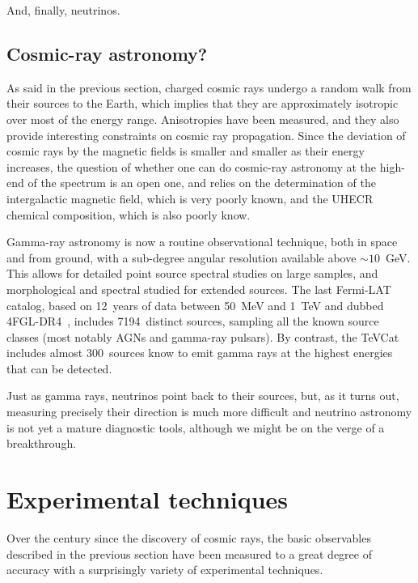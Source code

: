 And, finally, neutrinos.


\subsection{Cosmic-ray astronomy?}

As said in the previous section, charged cosmic rays undergo a random walk from
their sources to the Earth, which implies that they are approximately isotropic
over most of the energy range. Anisotropies have been measured, and they also
provide interesting constraints on cosmic ray propagation. Since the deviation of
cosmic rays by the magnetic fields is smaller and smaller as their energy increases,
the question of whether one can do cosmic-ray astronomy at the high-end of the
spectrum is an open one, and relies on the determination of the intergalactic
magnetic field, which is very poorly known, and the UHECR chemical composition,
which is also poorly know.

Gamma-ray astronomy is now a routine observational technique, both in space and
from ground, with a sub-degree angular resolution available above $\sim 10$~GeV.
This allows for detailed point source spectral studies on large samples, and
morphological and spectral studied for extended sources. The last Fermi-LAT
catalog, based on 12~years of data between 50~MeV and 1~TeV and dubbed
4FGL-DR4~\cite{2023arXiv230712546B}, includes 7194~distinct sources,
sampling all the known source classes (most notably AGNs and gamma-ray pulsars).
By contrast, the TeVCat includes almost 300~sources know to emit gamma rays at the
highest energies that can be detected.

Just as gamma rays, neutrinos point back to their sources, but, as it turns out,
measuring precisely their direction is much more difficult and neutrino astronomy
is not yet a mature diagnostic tools, although we might be on the verge of a
breakthrough.


\section{Experimental techniques}

Over the century since the discovery of cosmic rays, the basic observables described
in the previous section have been measured to a great degree of accuracy with
a surprisingly variety of experimental techniques.


